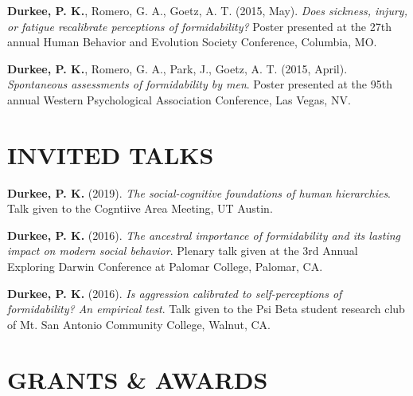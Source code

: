 \documentclass[10.5pt,]{article}
\begin{document}
\hangindent=0.5in \textbf{Durkee, P. K.}, Romero, G. A., Goetz, A. T.
(2015, May). \emph{Does sickness, injury, or fatigue recalibrate
perceptions of formidability?} Poster presented at the 27th annual Human
Behavior and Evolution Society Conference, Columbia, MO.

\hangindent=0.5in \textbf{Durkee, P. K.}, Romero, G. A., Park, J.,
Goetz, A. T. (2015, April). \emph{Spontaneous assessments of
formidability by men}. Poster presented at the 95th annual Western
Psychological Association Conference, Las Vegas, NV.

\hypertarget{invited-talks}{%
\section{INVITED TALKS}\label{invited-talks}}

\hangindent=0.5in \textbf{Durkee, P. K.} (2019). \emph{The
social-cognitive foundations of human hierarchies}. Talk given to the
Cogntiive Area Meeting, UT Austin.

\hangindent=0.5in \textbf{Durkee, P. K.} (2016). \emph{The ancestral
importance of formidability and its lasting impact on modern social
behavior}. Plenary talk given at the 3rd Annual Exploring Darwin
Conference at Palomar College, Palomar, CA.

\hangindent=0.5in \textbf{Durkee, P. K.} (2016). \emph{Is aggression
calibrated to self-perceptions of formidability? An empirical test}.
Talk given to the Psi Beta student research club of Mt. San Antonio
Community College, Walnut, CA.

\hypertarget{grants-awards}{%
\section{GRANTS \& AWARDS}\label{grants-awards}}
\end{document}

